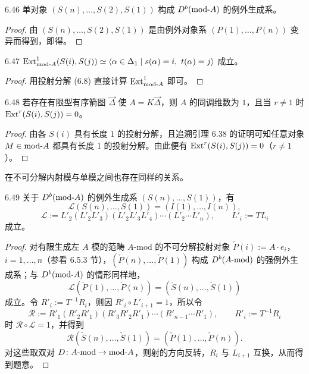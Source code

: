 \begin{corollary}{6.46}
单对象 $(S(n),\dots,S(2),S(1))$ 构成 $D^{b}(\mathrm{mod}\text{-}A)$ 的例外生成系。
\end{corollary}

\begin{proof}
由 $(S(n),\dots,S(2),S(1))$ 是由例外对象系 $(P(1),\dots,P(n))$ 变异而得到，即得。
\end{proof}

\begin{corollary}{6.47}
$\operatorname{Ext}^{1}_{\mathrm{mod}\text{-}A}(S(i),S(j))\simeq\langle\alpha\in\Delta_1\mid s(\alpha)=i,\ t(\alpha)=j\rangle$ 成立。
\end{corollary}

\begin{proof}
用投射分解 (6.8) 直接计算 $\operatorname{Ext}^{1}_{\mathrm{mod}\text{-}A}$ 即可。
\end{proof}

\begin{corollary}{6.48}
若存在有限型有序箭图 $\vec{\Delta}$ 使 $A=K\vec{\Delta}$，则 $A$ 的同调维数为 $1$，且当 $r\neq 1$ 时 $\operatorname{Ext}^{r}(S(i),S(j))=0$。
\end{corollary}

\begin{proof}
由各 $S(i)$ 具有长度 $1$ 的投射分解，且追溯引理 6.38 的证明可知任意对象 $M\in\mathrm{mod}\text{-}A$ 都具有长度 $1$ 的投射分解。由此便有 $\operatorname{Ext}^{r}(S(i),S(j))=0$（$r\neq 1$）。
\end{proof}

在不可分解内射模与单模之间也存在同样的关系。

\begin{proposition}{6.49}
关于 $D^{b}(\mathrm{mod}\text{-}A)$ 的例外生成系 $(S(n),\dots,S(1))$，有
\[
\mathcal L(S(n),\dots,S(1))=(I(1),\dots,I(n)),
\]
\[
\mathcal L:=L'_2(L'_2L'_3)(L'_2L'_3L'_4)\cdots(L'_2\cdots L'_n),\qquad L'_i:=TL_i
\]
成立。
\end{proposition}

\begin{proof}
对有限生成左 $A$ 模的范畴 $A\text{-}\mathrm{mod}$ 的不可分解投射对象 $\check P(i):=A\cdot e_i$，$i=1,\dots,n$（参看 6.5.3 节），$(\check P(n),\dots,\check P(1))$ 构成 $D^{b}(A\text{-}\mathrm{mod})$ 的强例外生成系；与 $D^{b}(\mathrm{mod}\text{-}A)$ 的情形同样地，
\[
\mathcal L(\check P(1),\dots,\check P(n))=(\check S(n),\dots,\check S(1))
\]
成立。令 $R'_i:=T^{-1}R_i$，则因 $R'_i\circ L'_{i+1}=1$，所以令
\[
\mathcal R:=R'_1(R'_2R'_1)(R'_3R'_2R'_1)\cdots(R'_{n-1}\cdots R'_1),\qquad R'_i:=T^{-1}R_i
\]
时 $\mathcal R\circ\mathcal L=1$，并得到
\[
\mathcal R(\check S(n),\dots,\check S(1))=(\check P(1),\dots,\check P(n)).
\]
对这些取双对 $D\colon A\text{-}\mathrm{mod}\to\mathrm{mod}\text{-}A$，则射的方向反转，$R_i$ 与 $L_{i+1}$ 互换，从而得到题意。
\end{proof}

